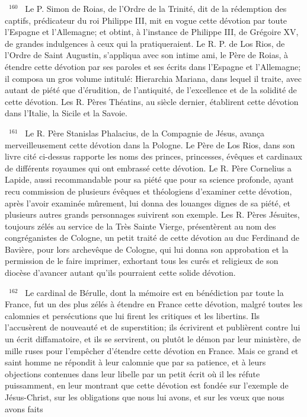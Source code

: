 \documentclass[paper=a5,pagesize=pdftex,fontsize=15pt,headinclude=on,twoside=off]{scrbook}
\newcommand{\negphantom}[1]{\settowidth{\dimen0}{#1}\hspace*{-\dimen0}}
\newcommand{\versenb}[1]{\par \vspace{10pt}~\negphantom{~${}^{#1}$~}${}^{#1}$~}
\begin{document}
\versenb{160} Le P. Simon de Roias, de l'Ordre de la Trinité, dit de la rédemption des captifs, prédicateur du roi Philippe III,
mit en vogue cette dévotion par toute l'Espagne et l'Allemagne; et obtint, à l'instance de Philippe III, de Grégoire
XV, de grandes indulgences à ceux qui la pratiqueraient.
Le R. P. de Los Rios, de l'Ordre de Saint Augustin, s'appliqua avec son intime ami, le Père de Roias, à étendre
cette dévotion par ses paroles et ses écrits dans l'Espagne et l'Allemagne; il composa un gros volume intitulé:
Hierarchia Mariana, dans lequel il traite, avec autant de piété que d'érudition, de l'antiquité, de l'excellence et de la
solidité de cette dévotion. Les R. Pères Théatins, au siècle dernier, établirent cette dévotion dans l'Italie, la Sicile et
la Savoie.
\versenb{161} Le R. Père Stanislas Phalacius, de la Compagnie de Jésus, avança merveilleusement cette dévotion dans la
Pologne.
Le Père de Los Rios, dans son livre cité ci-dessus rapporte les noms des princes, princesses, évêques et
cardinaux de différents royaumes qui ont embrassé cette dévotion. Le R. Père Cornelius a Lapide, aussi
recommandable pour sa piété que pour sa science profonde, ayant recu commission de plusieurs évêques et
théologiens d'examiner cette dévotion, après l'avoir examinée mûrement, lui donna des louanges dignes de sa
piété, et plusieurs autres grands personnages suivirent son exemple. Les R. Pères Jésuites, toujours zélés au
service de la Très Sainte Vierge, présentèrent au nom des congréganistes de Cologne, un petit traité de cette
dévotion au duc Ferdinand de Bavière, pour lors archevêque de Cologne, qui lui donna son approbation et la
permission de le faire imprimer, exhortant tous les curés et religieux de son diocèse d'avancer autant qu'ils
pourraient cette solide dévotion.
\versenb{162} Le cardinal de Bérulle, dont la mémoire est en bénédiction par toute la France, fut un des plus zélés à
étendre en France cette dévotion, malgré toutes les calomnies et persécutions que lui firent les critiques et les
libertins. Ils l'accusèrent de nouveauté et de superstition; ils écrivirent et publièrent contre lui un écrit diffamatoire,
et ils se servirent, ou plutôt le démon par leur ministère, de mille ruses pour l'empêcher d'étendre cette dévotion en
France. Mais ce grand et saint homme ne répondit à leur calomnie que par sa patience, et à leurs objections
contenues dans leur libelle par un petit écrit où il les réfute puissamment, en leur montrant que cette dévotion est
fondée sur l'exemple de Jésus-Christ, sur les obligations que nous lui avons, et sur les vœux que nous avons faits
\end{document}
